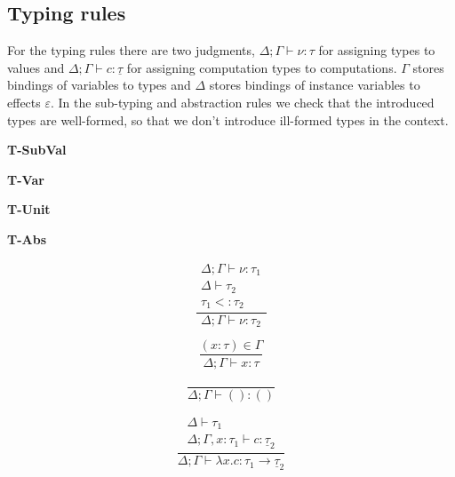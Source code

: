 \documentclass[12pt]{article}
\newcommand\eff[0]{\varepsilon}
\newcommand\ty[0]{\tau}
\newcommand\tunit[0]{()}
\newcommand\tarr[2]{#1 \rightarrow #2}
\newcommand\cty[0]{\underline{\ty}}
\newcommand\val[0]{\nu}
\newcommand\vunit[0]{()}
\newcommand\vabs[2]{\lambda #1 . #2}
\newcommand\comp[0]{c}
\newcommand\subty[2]{#1 <: #2}
\begin{document}
\subsection{Typing rules}
For the typing rules there are two judgments,
$\Delta;\Gamma \vdash \val : \ty$ for assigning types to values and $\Delta;\Gamma \vdash \comp : \cty$ for assigning computation types to computations. $\Gamma$ stores bindings of variables to types and $\Delta$ stores bindings of instance variables to effects $\eff$.
In the sub-typing and abstraction rules we check that the introduced types are well-formed, so that we don't introduce ill-formed types in the context.

\begin{minipage}{0.25\textwidth}
\textbf{T-SubVal}
\end{minipage}
\begin{minipage}{0.25\textwidth}
\textbf{T-Var}
\end{minipage}
\begin{minipage}{0.25\textwidth}
\textbf{T-Unit}
\end{minipage}
\begin{minipage}{0.25\textwidth}
\textbf{T-Abs}
\end{minipage}

\begin{minipage}{0.25\textwidth}
\[\frac{
	\begin{array}{l}
	\Delta;\Gamma \vdash \val : \ty_1 \\
	\Delta \vdash \ty_2 \\
	\subty{\ty_1}{\ty_2}
	\end{array}
}{
	\Delta;\Gamma \vdash \val : \ty_2
}\]
\end{minipage}
\begin{minipage}{0.25\textwidth}
\[\frac{
	(x:\ty) \in \Gamma
}{
	\Delta;\Gamma \vdash x : \ty
}\]
\end{minipage}
\begin{minipage}{0.25\textwidth}
\[\frac{
}{
	\Delta;\Gamma \vdash \vunit : \tunit
}\]
\end{minipage}
\begin{minipage}{0.25\textwidth}
\[\frac{
	\begin{array}{l}
	\Delta \vdash \ty_1 \\
	\Delta;\Gamma, x : \ty_1 \vdash \comp : \cty_2
	\end{array}
}{
	\Delta;\Gamma \vdash \vabs{x}{\comp} : \tarr{\ty_1}{\cty_2}
}\]
\end{minipage}
\end{document}
